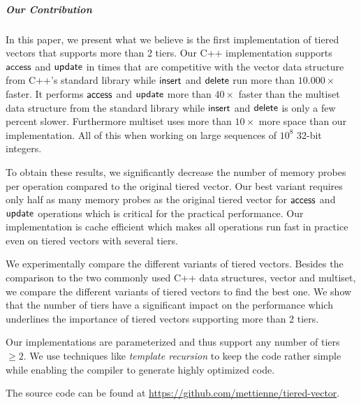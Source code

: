 \subparagraph{Our Contribution}

In this paper, we present what we believe is the first implementation of tiered vectors that supports more than 2 tiers. Our C++ implementation supports $\mathsf{access}$ and $\mathsf{update}$ in times that are competitive with the vector data structure from C++'s standard library while $\mathsf{insert}$ and $\mathsf{delete}$ run more than $10.000\times$ faster. It performs $\mathsf{access}$ and $\mathsf{update}$ more than $40 \times$ faster than the multiset data structure from the standard library while $\mathsf{insert}$ and $\mathsf{delete}$ is only a few percent slower. Furthermore multiset uses more than $10\times$ more space than our implementation. All of this when working on large sequences of $10^8$ 32-bit integers.

To obtain these results, we significantly decrease the number of memory probes per operation compared to the original tiered vector. Our best variant requires only half as many memory probes as the original tiered vector for $\mathsf{access}$ and $\mathsf{update}$ operations which is critical for the practical performance. Our implementation is cache efficient which makes all operations run fast in practice even on tiered vectors with several tiers.

We experimentally compare the different variants of tiered vectors. Besides the comparison to the two commonly used C++ data structures, vector and multiset, we compare the different variants of tiered vectors to find the best one. We show that the number of tiers have a significant impact on the performance which underlines the importance of tiered vectors supporting more than 2 tiers.

Our implementations are parameterized and thus support any number of tiers
$\geq 2$. We use techniques like \textit{template recursion} to keep the code rather
simple while enabling the compiler to generate highly optimized code.

The source code can be found at \url{https://github.com/mettienne/tiered-vector}.
